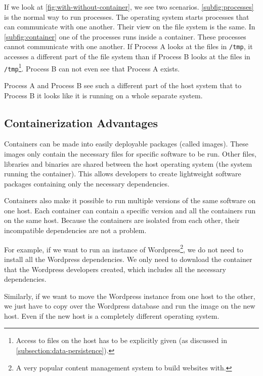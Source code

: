 If we look at \autoref{fig:with-without-container}, we see two scenarios. \autoref{subfig:processes} is the normal way to run processes. The operating system starts processes that can communicate with one another. Their view on the file system is the same.
In \autoref{subfig:container} one of the processes runs inside a container. These processes cannot communicate with one another. If Process A looks at the files in \lstinline{/tmp}, it accesses a different part of the file system than if Process B looks at the files in \lstinline{/tmp}\footnote{Access to files on the host has to be explicitly given (as discussed in \autoref{subsection:data-persistence}).}. Process B can not even see that Process A exists.

\hfill

Process A and Process B see such a different part of the host system that to Process B it looks like it is running on a whole separate system.

\subsection{Containerization Advantages}

Containers can be made into easily deployable packages (called images). These images only contain the necessary files for specific software to be run. Other files, libraries and binaries are shared between the host operating system (the system running the container). This allows developers to create lightweight software packages containing only the necessary dependencies.

\hfill

Containers also make it possible to run multiple versions of the same software on one host. Each container can contain a specific version and all the containers run on the same host. Because the containers are isolated from each other, their incompatible dependencies are not a problem.

\hfill

For example, if we want to run an instance of Wordpress\footnote{A very popular content management system to build websites with.}, we do not need to install all the Wordpress dependencies. We only need to download the container that the Wordpress developers created, which includes all the necessary dependencies.

Similarly, if we want to move the Wordpress instance from one host to the other, we just have to copy over the Wordpress database and run the image on the new host. Even if the new host is a completely different operating system.

